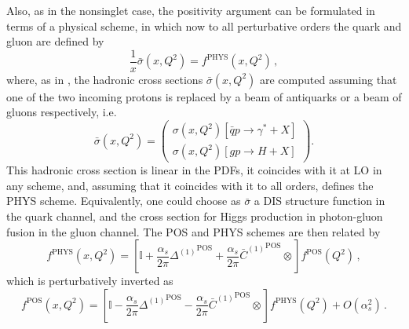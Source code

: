 Also, as in the nonsinglet case,  the positivity argument can be formulated in terms of
a physical scheme, in which now 
to all perturbative orders the quark and gluon are defined by
\begin{equation}\label{eq:pos/phys}
 \frac{1}{x} \bar\sigma(x,Q^2)=f^{\textrm{PHYS}}(x,Q^2) \,,
\end{equation}
where, as in \cite{Altarelli:1998gn}, the hadronic cross sections $\bar\sigma(x,Q^2)$ are computed
assuming that one of the two incoming protons is replaced 
by a beam of antiquarks or a beam of gluons respectively, i.e.\ 
\begin{equation}\label{eq:pos/physxsec}
   \bar\sigma(x,Q^2)=\left(\begin{array}{c} \sigma(x,Q^2)[\bar q
       p\to \gamma^*+X]\\ \sigma(x,Q^2)[gp \to H+X]\end{array}\right).
\end{equation}
This hadronic cross section is linear in the PDFs, it coincides with it
at LO in any scheme, and, assuming that it coincides with it to all
orders, defines the PHYS scheme. Equivalently, one could choose as
$\bar \sigma$ a DIS structure function in the quark channel, and the
cross section for Higgs production in photon-gluon fusion in the gluon
channel.
The POS and PHYS schemes are then related by
\begin{equation}\label{eq:pos/postodis}
f^{\textrm{PHYS}}(x,Q^2)=
\left[\mathbb{I}+\frac{\alpha_s}{2\pi} {\Delta^{(1)}}^{\textrm{POS}}
  +\frac{\alpha_s}{2\pi}  {\bar
    C^{(1)}{}}^{\textrm{POS}}\otimes\right]f^{\textrm{POS}}(Q^2) \,,
\end{equation}
which is perturbatively inverted as  
\begin{equation}\label{eq:pos/distopos}
f^{\textrm{POS}}(x,Q^2)=
\left[\mathbb{I}-\frac{\alpha_s}{2\pi} {\Delta^{(1)}}^{\textrm{POS}}
  -\frac{\alpha_s}{2\pi}  {\bar
    C^{(1)}{}}^{\textrm{POS}}\otimes\right]f^{\textrm{PHYS}}(Q^2)+O(\alpha_s^2)\,.
\end{equation}

